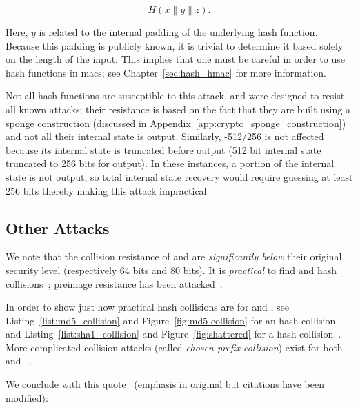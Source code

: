 \begin{equation}
    H(x\|y\|z).
\end{equation}

\noindent
Here, $y$ is related to the internal padding of the underlying
\gls{hash function}.
Because this padding is publicly known,
it is trivial to determine it based solely on the length of the input.
This implies that one must be careful in order to use
\glspl{hash function} in \glspl{mac};
see Chapter~\ref{sec:hash_hmac} for more information.

Not all \glspl{hash function} are susceptible to this attack.
\Keccak{} and \ShaThree{} were designed to resist all known attacks;
their resistance is based on the fact that they are built
using a sponge construction
(discussed in Appendix~\ref{app:crypto_sponge_construction})
and not all their internal state is output.
Similarly, \ShaTwo{}-512/256 is not affected because its internal state
is truncated before output
(512 bit internal state truncated to 256 bits for output).
In these instances, a portion of the internal state is not output,
so total internal state recovery would require guessing at least 256 bits
thereby making this attack impractical.

\subsection{Other Attacks}

We note that the collision resistance of \MDFive{} and \ShaOne{}
are \emph{significantly below} their original security level
(respectively 64 bits and 80 bits).
It is \emph{practical} to find \MDFive{} and \ShaOne{} hash
collisions~\cite{cryptoeprint:2004:199,cryptoeprint:2005:067,
cryptoeprint:2004:356,rfc6151,rfc6194};
\MDFive{} preimage resistance has been attacked~\cite{MD5FastPreimage2009}.

In order to show just how practical hash collisions are
for \MDFive{} and \ShaOne{},
see Listing~\ref{list:md5_collision}
and Figure~\ref{fig:md5-collision}
for an \MDFive{} hash collision~\cite{md5Collision}
and Listing~\ref{list:sha1_collision} and Figure~\ref{fig:shattered}
for a \ShaOne{} hash collision~\cite{sha1Collision}.
More complicated collision attacks
(called \emph{chosen-prefix collision})
exist for both \MDFive{} and
\ShaOne{}~\cite{stevens2012chosen,leurent2020sha1,cryptoeprint:2020/014}.

We conclude with this quote~\cite[Section 7]{cryptoeprint:2020/014}
(emphasis in original but citations have been modified):

